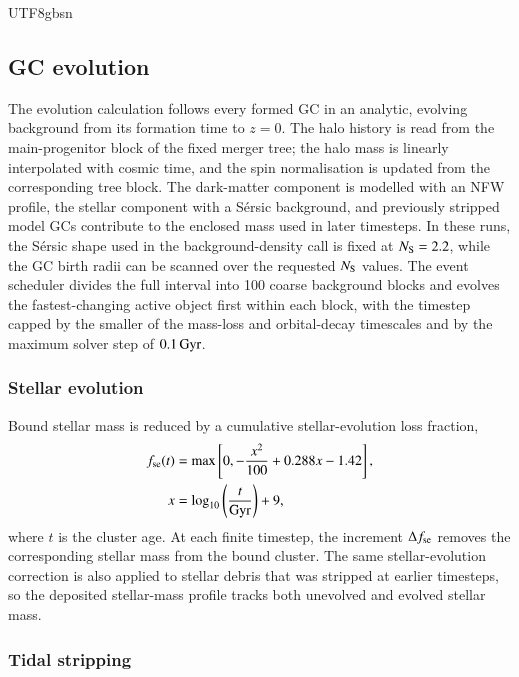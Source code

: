 \documentclass[trackchanges, twocolappendix, twocolumn]{aastex701}
\begin{document}
\begin{CJK*}{UTF8}{gbsn}
\subsection{GC evolution} \label{subsect:gc_evolution}

The evolution calculation follows every formed GC in an analytic, evolving background from its formation time to $z = 0$. The halo history is read from the main-progenitor block of the fixed merger tree; the halo mass is linearly interpolated with cosmic time, and the spin normalisation is updated from the corresponding tree block. The dark-matter component is modelled with an NFW profile, the stellar component with a S{\'e}rsic background, and previously stripped model GCs contribute to the enclosed mass used in later timesteps. In these runs, the S{\'e}rsic shape used in the background-density call is fixed at $N_{\rm S} = 2.2$, while the GC birth radii can be scanned over the requested $N_{\rm S}$ values. The event scheduler divides the full interval into 100 coarse background blocks and evolves the fastest-changing active object first within each block, with the timestep capped by the smaller of the mass-loss and orbital-decay timescales and by the maximum solver step of $0.1\,{\rm Gyr}$.

\subsubsection{Stellar evolution} \label{subsubsect:stellar_evolution}

Bound stellar mass is reduced by a cumulative stellar-evolution loss fraction,
\begin{align}
f_{\rm se}(t) & =
\max\left[
0,
- \dfrac{x^2}{100} + 0.288 x - 1.42
\right],
\notag \\
x & = \log_{10}\left(\dfrac{t}{\rm Gyr}\right) + 9 ,
\label{eq:stellar_evolution}
\end{align}
where $t$ is the cluster age. At each finite timestep, the increment $\Delta f_{\rm se}$ removes the corresponding stellar mass from the bound cluster. The same stellar-evolution correction is also applied to stellar debris that was stripped at earlier timesteps, so the deposited stellar-mass profile tracks both unevolved and evolved stellar mass.

\subsubsection{Tidal stripping} \label{subsubsect:tidal_stripping}


\end{CJK*}
\end{document}
